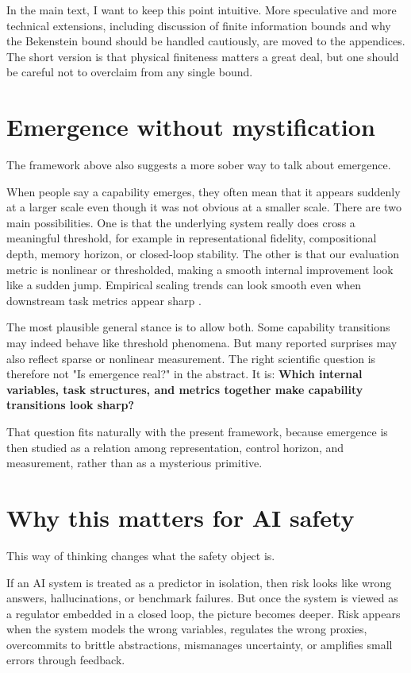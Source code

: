 \documentclass[11pt]{article}
\begin{document}
In the main text, I want to keep this point intuitive. More speculative and more technical extensions, including discussion of finite information bounds and why the Bekenstein bound should be handled cautiously, are moved to the appendices. The short version is that physical finiteness matters a great deal, but one should be careful not to overclaim from any single bound.

\section{Emergence without mystification}


The framework above also suggests a more sober way to talk about emergence.

When people say a capability emerges, they often mean that it appears suddenly at a larger scale even though it was not obvious at a smaller scale. There are two main possibilities. One is that the underlying system really does cross a meaningful threshold, for example in representational fidelity, compositional depth, memory horizon, or closed-loop stability. The other is that our evaluation metric is nonlinear or thresholded, making a smooth internal improvement look like a sudden jump. Empirical scaling trends can look smooth even when downstream task metrics appear sharp \citep{kaplan2020,schaeffer2023}.

The most plausible general stance is to allow both. Some capability transitions may indeed behave like threshold phenomena. But many reported surprises may also reflect sparse or nonlinear measurement. The right scientific question is therefore not "Is emergence real?" in the abstract. It is: \textbf{Which internal variables, task structures, and metrics together make capability transitions look sharp?}

That question fits naturally with the present framework, because emergence is then studied as a relation among representation, control horizon, and measurement, rather than as a mysterious primitive.

\section{Why this matters for AI safety}


This way of thinking changes what the safety object is.

If an AI system is treated as a predictor in isolation, then risk looks like wrong answers, hallucinations, or benchmark failures. But once the system is viewed as a regulator embedded in a closed loop, the picture becomes deeper. Risk appears when the system models the wrong variables, regulates the wrong proxies, overcommits to brittle abstractions, mismanages uncertainty, or amplifies small errors through feedback.
\end{document}

